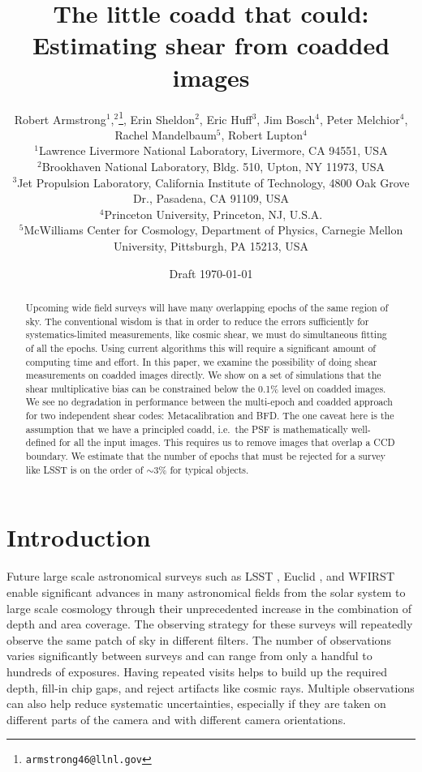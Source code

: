 \documentclass[fleqn,useAMS,usenatbib]{mnras}
\title[The little coadd that could]{The little coadd that could:  Estimating shear from coadded images}
\author[Armstrong et~al.]{Robert Armstrong$^1$,$^2$\thanks{\tt armstrong46@llnl.gov}, Erin Sheldon$^2$, Eric
  Huff$^3$, Jim Bosch$^4$, Peter Melchior$^4$,
  \newauthor
  Rachel Mandelbaum$^5$, Robert Lupton$^4$
  \\$^1$Lawrence Livermore National Laboratory, Livermore, CA 94551, USA
  \\$^2$Brookhaven National Laboratory, Bldg. 510, Upton, NY 11973, USA 
  \\$^3$Jet Propulsion Laboratory, California Institute of Technology, 4800 Oak Grove Dr., Pasadena, CA 91109, USA
  \\$^4$Princeton University, Princeton, NJ, U.S.A.
  \\$^5$McWilliams Center for Cosmology, Department of Physics, Carnegie Mellon University, Pittsburgh, PA 15213, USA
}
\begin{document}
\date{Draft \today}
\maketitle

\begin{abstract}
Upcoming wide field surveys will have many overlapping epochs of the same 
region of sky.  The conventional wisdom is that in order to reduce the 
errors sufficiently for systematics-limited measurements, like 
cosmic shear, we must do simultaneous fitting of all the epochs.  Using current 
algorithms this will require a significant amount of computing time and effort. 
In this paper, we examine the possibility of doing shear measurements on 
coadded images directly.  We show on a set of simulations that the shear multiplicative
bias can be constrained below the 0.1$\%$ level on coadded images.
We see no degradation in performance between the multi-epoch and coadded approach for
two independent shear codes: Metacalibration and BFD.  The one 
caveat here is the assumption that we have a principled
coadd, i.e.\ the PSF is mathematically well-defined for all the input images.
This requires us to remove images that overlap a CCD boundary.  We estimate 
that the number of epochs that must be rejected for a survey like LSST is on the 
order of $\sim 3\%$ for typical objects.
\end{abstract}

\section{Introduction}
\vspace{0.5in}

Future large scale astronomical surveys such as LSST \citep{LSST2009}, Euclid 
\citep{Laureijs2011}, and WFIRST \citep{Spergel2015} enable 
significant advances in many astronomical fields from the solar system to large 
scale cosmology through their unprecedented 
increase in the combination of depth and area coverage.
The observing strategy for these surveys will repeatedly 
observe the same patch of sky in different filters.  The number of observations 
varies significantly between surveys and can range from only a handful to 
hundreds of exposures.  Having repeated visits helps to build up the required 
depth, fill-in chip gaps, and reject artifacts like cosmic rays.  Multiple 
observations can also help reduce systematic uncertainties, especially if they 
are taken on different parts of the camera and with different camera orientations.
\end{document}
